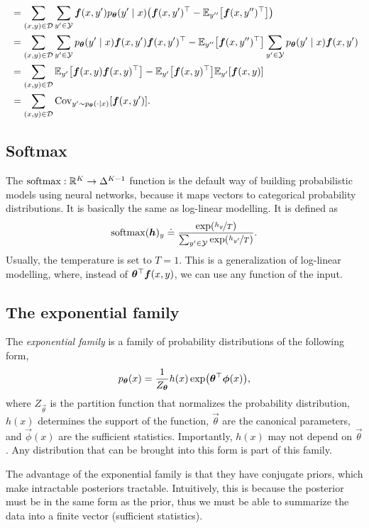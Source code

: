 \begin{align*}
  &= \sum_{(x,y)\in\mathcal{D}} \sum_{y'\in\mathcal{Y}} \vec{f}(x,y') p_{\vec{\theta}}(y'\mid x) \lft( \transpose{\vec{f}(x,y')} - \E_{y''} \lft[ \transpose{\vec{f}(x,y'')} \rgt] \rgt) \\
  &= \sum_{(x,y)\in\mathcal{D}} \sum_{y'\in\mathcal{Y}} p_{\vec{\theta}}(y'\mid x) \vec{f}(x,y') \transpose{\vec{f}(x,y')}  - \E_{y''} \lft[ \transpose{\vec{f}(x,y'')} \rgt] \sum_{y'\in\mathcal{Y}} p_{\vec{\theta}}(y'\mid x) \vec{f}(x,y') \\
  &= \sum_{(x,y)\in\mathcal{D}} \E_{y'} \lft[ \vec{f}(x,y) \transpose{\vec{f}(x,y)} \rgt]  - \E_{y'} \lft[ \transpose{\vec{f}(x,y)} \rgt] \E_{y'} \lft[ \vec{f}(x,y) \rgt] \\
  &= \sum_{(x,y)\in\mathcal{D}} \mathrm{Cov}_{y' \sim p_{\vec{\theta}}(\cdot\mid x)} \lft[ \vec{f}(x,y') \rgt]
.\end{align*}

\subsection{Softmax}


The $\mathrm{softmax}: \mathbb{R}^K \to \Delta^{K-1}$ function is the default way of building
probabilistic models using neural networks, because it maps vectors to
categorical probability distributions. It is basically the same as log-linear
modelling. It is defined as \[
  \softmax(\vec{h})_y \doteq \frac{\exp \lft( \nicefrac{h_y}{T} \rgt)}{\sum_{y'\in\mathcal{Y}} \exp \lft( \nicefrac{h_{y'}}{T} \rgt)}
.\]
Usually, the temperature is set to $T=1$. This is a generalization of
log-linear modelling, where, instead of $\bm{\theta}^\top
\bm{f}(x,y)$, we can use any function of the input.

\subsection{The exponential family}

The \textit{exponential family} is a family of probability distributions of the
following form, \[
  p_{\vec{\theta}}(x) = \frac{1}{Z_{\vec{\theta}}} h(x) \exp \lft( \transpose{\vec{\theta}} \vec{\phi}(x) \rgt)
,\]
where $Z_{\vec{\theta}}$ is the partition function that normalizes the
probability distribution, $h(x)$ determines the support of the function,
$\vec{\theta}$ are the canonical parameters, and $\vec{\phi}(x)$ are the
sufficient statistics. Importantly, $h(x)$ may not depend on $\vec{\theta}$.
Any distribution that can be brought into this form is part of this
family.

The advantage of the exponential family is that they have conjugate priors,
which make intractable posteriors tractable. Intuitively, this is because the
posterior must be in the same form as the prior, thus we must be able to
summarize the data into a finite vector (sufficient statistics).
